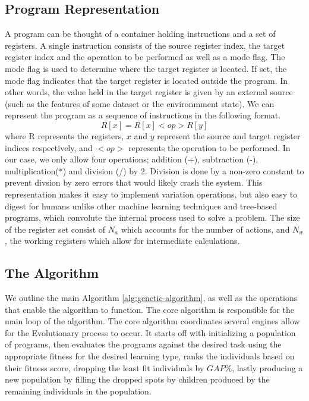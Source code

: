 \documentclass[12pt, final]{dalcsthesis}
\begin{document}
\subsection{Program Representation}
A program can be thought of a container holding instructions and a set of registers. A single instruction consists of the source register index, the target register index and the operation to be performed as well as a mode flag. The mode flag is used to determine where the target register is located. If set, the mode flag indicates that the target register is located outside the program. In other words, the value held in the target register is given by an external source (such as the features of some dataset or the environmment state). We can represent the program as a sequence of instructions in the following format. $$R[x] = R[x] <op>  R[y]$$ where R represents the registers, $x$ and $y$ represent the source and target register indices respectively, and $<op>$ represents the operation to be performed. In our case, we only allow four operations; addition (+),
subtraction (-), multiplication(*) and division (/) by 2. Division is done by a non-zero constant to prevent divsion by zero errors that would likely crash the system. This representation makes it easy to implement variation operations, but also easy to digest for humans unlike other machine learning techniques and tree-based programs, which convolute the internal process used to solve a problem. The size of the register set consist of $N_a$ which accounts for the number of actions, and $N_w$, the working registers which allow for intermediate calculations.

\subsection{The Algorithm}

We outline the main Algorithm \ref{alg:genetic-algorithm}, as well as the operations that enable the algorithm to function. The core algorithm is responsible for the main loop of the algorithm. The core algorithm coordinates several engines allow for the Evolutionary process to occur. It starts off with initializing a population of programs, then evaluates the programs against the desired task using the appropriate fitness for the desired learning type, ranks the individuals based on their fitness score,
dropping the least fit individuals by $GAP\%$, lastly producing a new population by filling the
dropped spots by children produced by the remaining individuals in the population.
\end{document}
